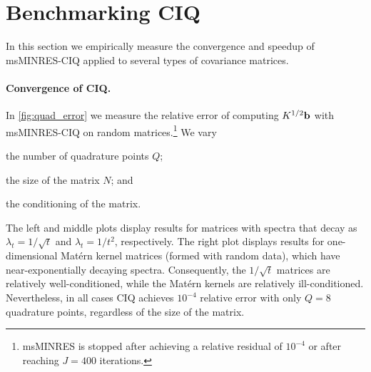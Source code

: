 
\section{Benchmarking CIQ}
\label{sec:ciq_empirical}

In this section we empirically measure the convergence and speedup of msMINRES-CIQ applied to several types of covariance matrices.

\paragraph{Convergence of CIQ.}
In \cref{fig:quad_error} we measure the relative error of computing $K^{1/2} \mathbf{b}$ with msMINRES-CIQ on random matrices.\footnote{
	msMINRES is stopped after achieving a relative residual of $10^{-4}$ or after reaching $J=400$ iterations.
}
We vary
%
\begin{enumerate*}
  \item the number of quadrature points $Q$;
  \item the size of the matrix $N$; and
  \item the conditioning of the matrix.
\end{enumerate*}
%
The left and middle plots display results for matrices with spectra that decay as $\lambda_t = 1 / \sqrt{t}$ and $\lambda_t = 1 / t^2$, respectively.
The right plot displays results for one-dimensional Mat\'ern kernel matrices (formed with random data), which have near-exponentially decaying spectra.
Consequently, the $1 / \sqrt{t}$ matrices are relatively well-conditioned, while the Mat\'ern kernels are relatively ill-conditioned.
Nevertheless, in all cases CIQ achieves $10^{-4}$ relative error with only $Q=8$ quadrature points, regardless of the size of the matrix.

